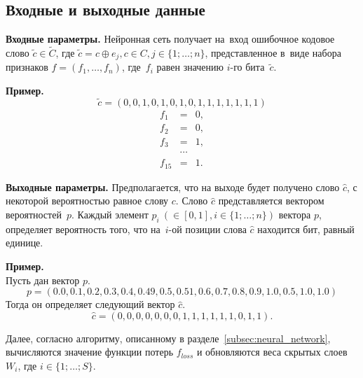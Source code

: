 \subsection{Входные и выходные данные}\label{subsec:input_output}

\textbf{Входные параметры.} Нейронная сеть получает на~вход ошибочное кодовое слово $\widetilde{c} \in \widetilde{C}$,
где $\widetilde{c} = c \oplus e_j, c \in C, j \in \{1;\dots; n\}$,
представленное в~виде набора признаков $f = (f_1, \dots, f_n)$, где~$f_i$ равен значению $i$-го бита~$\widetilde{c}$.

\textbf{Пример.}
\begin{equation}
    \nonumber\widetilde{c} = (0, 0, 1, 0, 1, 0, 1, 0, 1, 1, 1, 1, 1, 1, 1)
\end{equation}
\begin{eqnarray}
    \nonumber f_1 &=& 0, \\
    \nonumber f_2 &=& 0, \\
    \nonumber f_3 &=& 1, \\
    \nonumber &\cdots& \\
    \nonumber f_{15} &=& 1.
\end{eqnarray}

\textbf{Выходные параметры.} Предполагается, что на выходе будет получено слово $\hat{c}$, с некоторой вероятностью равное слову $c$.
Слово $\hat{c}$ представляется вектором вероятностей~$p$. Каждый элемент $p_i~(\in [0, 1], i \in \{1;\dots; n\})$ вектора $p$, определяет вероятность того, что на~$i$-ой позиции слова $\hat{c}$ находится бит, равный единице.

\textbf{Пример.} \\
Пусть дан вектор $p$.
$$p = (0.0, 0.1, 0.2, 0.3, 0.4, 0.49, 0.5, 0.51, 0.6, 0.7, 0.8, 0.9, 1.0, 0.5, 1.0, 1.0)$$
Тогда он определяет следующий вектор $\hat{c}$.
$$\hat{c} = (0, 0, 0, 0, 0, 0, 0, 1, 1, 1, 1, 1, 1, 0, 1, 1).$$

Далее, согласно алгоритму, описанному в разделе~\ref{subsec:neural_network}, вычисляются значение функции потерь $f_{loss}$
и обновляются веса скрытых слоев $W_i$, где $i\in\{1;\dots; S\}$.

